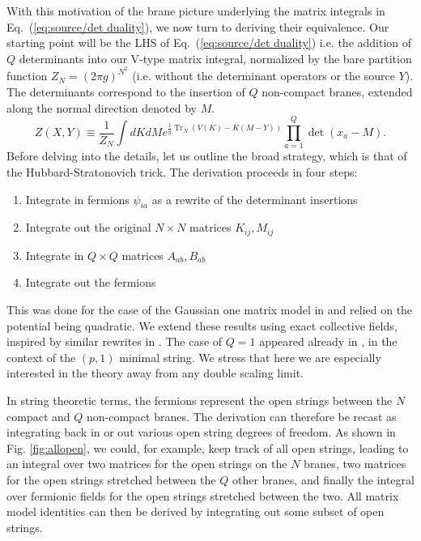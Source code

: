 \documentclass[english]{article}
\DeclareMathOperator{\Tr}{Tr}
\begin{document}
With this motivation of the brane picture underlying the matrix integrals in Eq.~(\ref{eq:source/det duality}), we now turn to deriving their equivalence. 
Our starting point will be the LHS of Eq.~(\ref{eq:source/det duality}) i.e. the addition of $Q$ determinants into our V-type matrix integral, normalized by the bare partition function $Z_N=(2\pi g)^{N^{2}}$  (i.e. without the determinant operators or the source $Y$). The determinants correspond to the insertion of $Q$ non-compact branes, extended along the normal direction denoted by $M$. 
\begin{equation}
    Z(X,Y) \equiv \frac{1}{Z_{N}}\int dK dM e^{\frac{1}{g} \Tr_{N} \left( V(K)-K(M-Y) \right)} \prod_{a=1}^{Q} \det\left(x_a -M \right).\label{eq:ZXY}
\end{equation}
Before delving into the details, let us outline the broad strategy, which is that of the Hubbard-Stratonovich trick. The derivation proceeds in four steps: 

\begin{enumerate}
    \item Integrate in fermions $\psi_{ia}$ as a rewrite of the determinant insertions
    \item Integrate out the original $N\times N $ matrices $K_{ij},M_{ij}$
    \item Integrate in $Q \times Q$ matrices $A_{ab},B_{ab}$
    \item Integrate out the fermions
\end{enumerate} 
This was done for the case of the Gaussian one matrix model in \cite{exact,Brezin:2016eax} and relied on the potential being quadratic. We extend these results using exact collective fields, inspired by similar rewrites in \cite{hartnoll2019topological}. The case of $Q=1$ appeared already in \cite{Hashimoto_2005}, in the context of the $(p,1)$ minimal string. We stress that here we are especially interested in the theory away from any double scaling limit. 

In string theoretic terms, the fermions represent the open strings between the $N$ compact and $Q$ non-compact branes. The derivation can therefore be recast as integrating back in or out various open string degrees of freedom. As shown in Fig. \ref{fig:allopen}, we could, for example, keep track of all open strings, leading to an integral over two matrices for the open strings on the $N$ branes, two matrices for the open strings stretched between the $Q$ other branes, and finally the integral over fermionic fields for the open strings stretched between the two. All matrix model identities can then be derived by integrating out some subset of open strings.  
\end{document}

